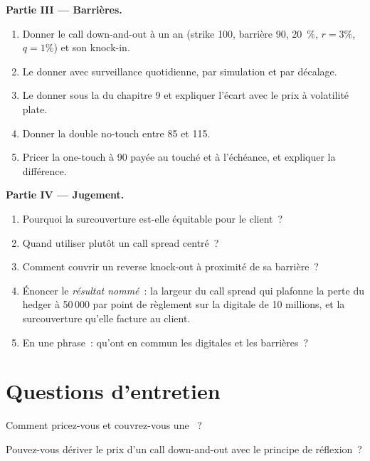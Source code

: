 \begin{problem}
\medskip\noindent\textbf{Partie III --- Barrières.}
\begin{enumerate}[resume]
\item Donner le call down-and-out à un an (strike 100, barrière 90, 20~\%, $r=3\%$, $q=1\%$) et son knock-in.
\item Le donner avec surveillance quotidienne, par simulation et par décalage.
\item Le donner sous la  du chapitre 9 et expliquer l'écart avec le prix à volatilité plate.
\item Donner la double no-touch entre 85 et 115.
\item Pricer la one-touch à 90 payée au touché et à l'échéance, et expliquer la différence.
\end{enumerate}

\medskip\noindent\textbf{Partie IV --- Jugement.}
\begin{enumerate}[resume]
\item Pourquoi la surcouverture est-elle équitable pour le client~?
\item Quand utiliser plutôt un call spread centré~?
\item Comment couvrir un reverse knock-out à proximité de sa barrière~?
\item Énoncer le \emph{résultat nommé}~: la largeur du call spread qui plafonne la perte du hedger à 50\,000 par point de règlement sur
la digitale de 10 millions, et la surcouverture qu'elle facture au client.
\item En une phrase~: qu'ont en commun les digitales et les barrières~?
\end{enumerate}
\end{problem}

\section{Questions d'entretien}

\begin{interviewq}\label{iq:dv:barriers-and-digitals:1}
Comment pricez-vous et couvrez-vous une ~?
\end{interviewq}

\begin{interviewq}\label{iq:dv:barriers-and-digitals:2}
Pouvez-vous dériver le prix d'un call down-and-out avec le principe de réflexion~?
\end{interviewq}

